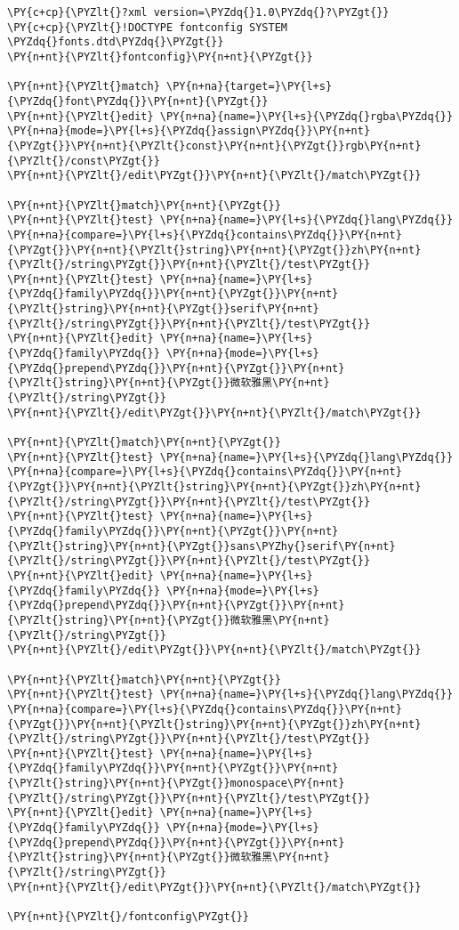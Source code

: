\begin{Verbatim}[commandchars=\\\{\}]
\PY{c+cp}{\PYZlt{}?xml version=\PYZdq{}1.0\PYZdq{}?\PYZgt{}}
\PY{c+cp}{\PYZlt{}!DOCTYPE fontconfig SYSTEM \PYZdq{}fonts.dtd\PYZdq{}\PYZgt{}}
\PY{n+nt}{\PYZlt{}fontconfig}\PY{n+nt}{\PYZgt{}}

\PY{n+nt}{\PYZlt{}match} \PY{n+na}{target=}\PY{l+s}{\PYZdq{}font\PYZdq{}}\PY{n+nt}{\PYZgt{}}
\PY{n+nt}{\PYZlt{}edit} \PY{n+na}{name=}\PY{l+s}{\PYZdq{}rgba\PYZdq{}} \PY{n+na}{mode=}\PY{l+s}{\PYZdq{}assign\PYZdq{}}\PY{n+nt}{\PYZgt{}}\PY{n+nt}{\PYZlt{}const}\PY{n+nt}{\PYZgt{}}rgb\PY{n+nt}{\PYZlt{}/const\PYZgt{}}
\PY{n+nt}{\PYZlt{}/edit\PYZgt{}}\PY{n+nt}{\PYZlt{}/match\PYZgt{}}

\PY{n+nt}{\PYZlt{}match}\PY{n+nt}{\PYZgt{}}
\PY{n+nt}{\PYZlt{}test} \PY{n+na}{name=}\PY{l+s}{\PYZdq{}lang\PYZdq{}} \PY{n+na}{compare=}\PY{l+s}{\PYZdq{}contains\PYZdq{}}\PY{n+nt}{\PYZgt{}}\PY{n+nt}{\PYZlt{}string}\PY{n+nt}{\PYZgt{}}zh\PY{n+nt}{\PYZlt{}/string\PYZgt{}}\PY{n+nt}{\PYZlt{}/test\PYZgt{}}
\PY{n+nt}{\PYZlt{}test} \PY{n+na}{name=}\PY{l+s}{\PYZdq{}family\PYZdq{}}\PY{n+nt}{\PYZgt{}}\PY{n+nt}{\PYZlt{}string}\PY{n+nt}{\PYZgt{}}serif\PY{n+nt}{\PYZlt{}/string\PYZgt{}}\PY{n+nt}{\PYZlt{}/test\PYZgt{}}
\PY{n+nt}{\PYZlt{}edit} \PY{n+na}{name=}\PY{l+s}{\PYZdq{}family\PYZdq{}} \PY{n+na}{mode=}\PY{l+s}{\PYZdq{}prepend\PYZdq{}}\PY{n+nt}{\PYZgt{}}\PY{n+nt}{\PYZlt{}string}\PY{n+nt}{\PYZgt{}}微软雅黑\PY{n+nt}{\PYZlt{}/string\PYZgt{}}
\PY{n+nt}{\PYZlt{}/edit\PYZgt{}}\PY{n+nt}{\PYZlt{}/match\PYZgt{}}

\PY{n+nt}{\PYZlt{}match}\PY{n+nt}{\PYZgt{}}
\PY{n+nt}{\PYZlt{}test} \PY{n+na}{name=}\PY{l+s}{\PYZdq{}lang\PYZdq{}} \PY{n+na}{compare=}\PY{l+s}{\PYZdq{}contains\PYZdq{}}\PY{n+nt}{\PYZgt{}}\PY{n+nt}{\PYZlt{}string}\PY{n+nt}{\PYZgt{}}zh\PY{n+nt}{\PYZlt{}/string\PYZgt{}}\PY{n+nt}{\PYZlt{}/test\PYZgt{}}
\PY{n+nt}{\PYZlt{}test} \PY{n+na}{name=}\PY{l+s}{\PYZdq{}family\PYZdq{}}\PY{n+nt}{\PYZgt{}}\PY{n+nt}{\PYZlt{}string}\PY{n+nt}{\PYZgt{}}sans\PYZhy{}serif\PY{n+nt}{\PYZlt{}/string\PYZgt{}}\PY{n+nt}{\PYZlt{}/test\PYZgt{}}
\PY{n+nt}{\PYZlt{}edit} \PY{n+na}{name=}\PY{l+s}{\PYZdq{}family\PYZdq{}} \PY{n+na}{mode=}\PY{l+s}{\PYZdq{}prepend\PYZdq{}}\PY{n+nt}{\PYZgt{}}\PY{n+nt}{\PYZlt{}string}\PY{n+nt}{\PYZgt{}}微软雅黑\PY{n+nt}{\PYZlt{}/string\PYZgt{}}
\PY{n+nt}{\PYZlt{}/edit\PYZgt{}}\PY{n+nt}{\PYZlt{}/match\PYZgt{}}

\PY{n+nt}{\PYZlt{}match}\PY{n+nt}{\PYZgt{}}
\PY{n+nt}{\PYZlt{}test} \PY{n+na}{name=}\PY{l+s}{\PYZdq{}lang\PYZdq{}} \PY{n+na}{compare=}\PY{l+s}{\PYZdq{}contains\PYZdq{}}\PY{n+nt}{\PYZgt{}}\PY{n+nt}{\PYZlt{}string}\PY{n+nt}{\PYZgt{}}zh\PY{n+nt}{\PYZlt{}/string\PYZgt{}}\PY{n+nt}{\PYZlt{}/test\PYZgt{}}
\PY{n+nt}{\PYZlt{}test} \PY{n+na}{name=}\PY{l+s}{\PYZdq{}family\PYZdq{}}\PY{n+nt}{\PYZgt{}}\PY{n+nt}{\PYZlt{}string}\PY{n+nt}{\PYZgt{}}monospace\PY{n+nt}{\PYZlt{}/string\PYZgt{}}\PY{n+nt}{\PYZlt{}/test\PYZgt{}}
\PY{n+nt}{\PYZlt{}edit} \PY{n+na}{name=}\PY{l+s}{\PYZdq{}family\PYZdq{}} \PY{n+na}{mode=}\PY{l+s}{\PYZdq{}prepend\PYZdq{}}\PY{n+nt}{\PYZgt{}}\PY{n+nt}{\PYZlt{}string}\PY{n+nt}{\PYZgt{}}微软雅黑\PY{n+nt}{\PYZlt{}/string\PYZgt{}}
\PY{n+nt}{\PYZlt{}/edit\PYZgt{}}\PY{n+nt}{\PYZlt{}/match\PYZgt{}}

\PY{n+nt}{\PYZlt{}/fontconfig\PYZgt{}}
\end{Verbatim}
